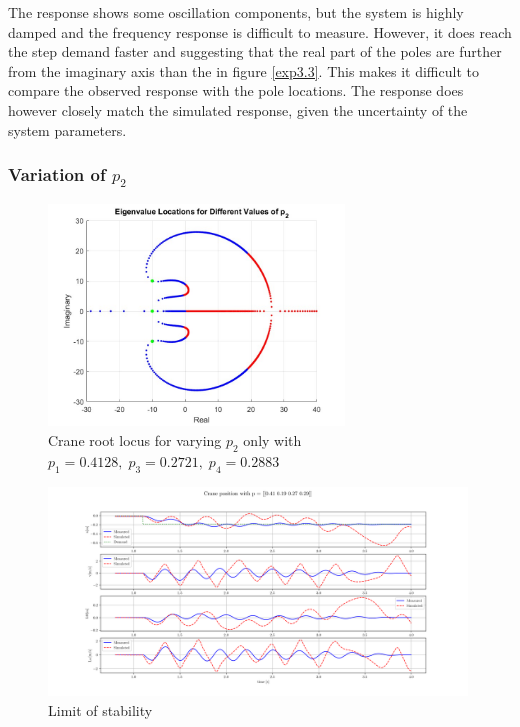 \documentclass{article}
\begin{document}
The response shows some oscillation components, but the system is highly damped and the frequency response is difficult to measure.
However, it does reach the step demand faster and suggesting that the real part of the poles are further from the imaginary axis than the in figure \ref{exp3.3}. 
This makes it difficult to compare the observed response with the pole locations.
The response does however closely match the simulated response, given the uncertainty of the system parameters.

\subsubsection{Variation of $p_2$}

\begin{figure}[H]
  \centering
  \includegraphics[width=0.7\textwidth]{figures/3.5roots.jpg}
  \caption{Crane root locus for varying $p_2$ only with $p_1 = 0.4128,\;p_3 = 0.2721,\;p_4 = 0.2883$}
  \label{fig:roots3.5}
\end{figure}

\begin{figure}[H]
  \centering
  \includegraphics[width=0.99\textwidth]{figures/3.5.png}
  \caption{Limit of stability}
  \label{fig:exp3.5}
\end{figure}
\end{document}
